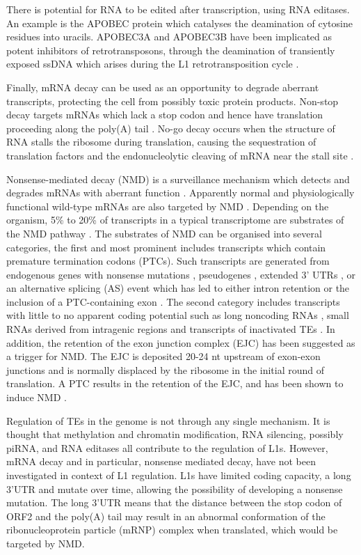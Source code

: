 \documentclass[12pt]{article}
\begin{document}
			There is potential for RNA to be edited after transcription, using RNA editases. An example is the APOBEC protein which catalyses the deamination of cytosine residues into uracils. APOBEC3A and APOBEC3B have been implicated as potent inhibitors of retrotransposons, through the deamination of transiently exposed ssDNA which arises during the L1 retrotransposition cycle \citep{Bogerd06, Richardson14}. 
			
			Finally, mRNA decay can be used as an opportunity to degrade aberrant transcripts, protecting the cell from possibly toxic protein products. Non-stop decay targets mRNAs which lack a stop codon and hence have translation proceeding along the poly(A) tail \citep{Hoof02}. No-go decay occurs when the structure of RNA stalls the ribosome during translation, causing the sequestration of translation factors and the endonucleolytic cleaving of mRNA near the stall site \citep{Doma06}. 
			
			Nonsense-mediated decay (NMD) is a surveillance mechanism which detects and degrades mRNAs with aberrant function \citep{ Kervestin12, Lykke-Andersen14}. Apparently normal and physiologically functional wild-type mRNAs are also targeted by NMD \citep{Schweingruber13}. Depending on the organism, 5\% to 20\% of transcripts in a typical transcriptome are substrates of the NMD pathway \citep{He15}. The substrates of NMD can be organised into several categories, the first and most prominent includes transcripts which contain premature termination codons (PTCs). Such transcripts are generated from endogenous genes with nonsense mutations \citep{Conti05}, pseudogenes \citep{Mcglincy08}, extended 3' UTRs \citep{Garneau07}, or an alternative splicing (AS) event which has led to either intron retention or the inclusion of a PTC-containing exon \citep{Ge14,Ni07}. The second category includes transcripts with little to no apparent coding potential such as long noncoding RNAs \citep{Lykke-Andersenb14}, small RNAs derived from intragenic regions \citep{Smith14} and transcripts of inactivated TEs \citep{He03}. In addition, the retention of the exon junction complex (EJC) has been suggested as a trigger for NMD. The EJC is deposited 20-24 nt upstream of exon-exon junctions \citep{Le-Hir00} and is normally displaced by the ribosome in the initial round of translation. A PTC results in the retention of the EJC, and has been shown to induce NMD \citep{Gehring05, Lykke-Andersen01}. 
			
			Regulation of TEs in the genome is not through any single mechanism. It is thought that methylation and chromatin modification, RNA silencing, possibly piRNA, and RNA editases all contribute to the regulation of L1s. However, mRNA decay and in particular, nonsense mediated decay, have not been investigated in context of L1 regulation. L1s have limited coding capacity, a long 3'UTR and mutate over time, allowing the possibility of developing a nonsense mutation. The long 3'UTR means that the distance between the stop codon of ORF2 and the poly(A) tail may result in an abnormal conformation of the ribonucleoprotein particle (mRNP) complex when translated, which would be targeted by NMD. 
\end{document}
